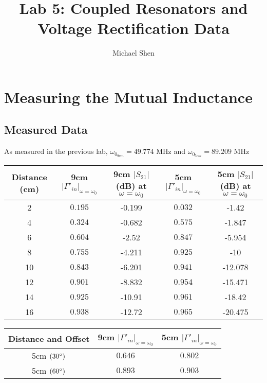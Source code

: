 \documentclass{article}
\begin{document}
\title{Lab 5: Coupled Resonators and Voltage Rectification Data}
\author{Michael Shen}
\date{}
\maketitle

\section{Measuring the Mutual Inductance}

\subsection{Measured Data}
As measured in the previous lab, $\omega_{0_{9cm}} = 49.774$ MHz and $\omega_{0_{5cm}} = 89.209$ MHz

\begin{table}[H]
\centering
\begin{tabular}{|c|c|c|c|c|}
\hline
Distance (cm)& 9cm $\vert\Gamma '_{in}\vert_{\omega=\omega_0}$     
			 & 9cm $\vert S_{21}\vert$ (dB) at $\omega = \omega_0$
			 & 5cm $\vert\Gamma '_{in}\vert_{\omega=\omega_0}$     
			 & 5cm $\vert S_{21}\vert$ (dB) at $\omega = \omega_0$ \\ \hline
2   		 & $0.195$  & -0.199 & $0.032$  & -1.42   \\ \hline
4   	 	 & $0.324$  & -0.682 & $0.575$  & -1.847  \\ \hline
6   	 	 & $0.604$  & -2.52  & $0.847$  & -5.954  \\ \hline
8		     & $0.755$  & -4.211 & $0.925$  & -10     \\ \hline
10  		 & $0.843$  & -6.201 & $0.941$  & -12.078 \\ \hline
12 			 & $0.901$  & -8.832 & $0.954$  & -15.471 \\ \hline
14 			 & $0.925$  & -10.91 & $0.961$  & -18.42  \\ \hline
16  		 & $0.938$  & -12.72 & $0.965$  & -20.475 \\ \hline
\end{tabular}
\end{table}

\begin{table}[h]
\centering
\begin{tabular}{|c|c|c|}
\hline
Distance and Offset	  & 9cm $\vert\Gamma '_{in}\vert_{\omega=\omega_0}$      
			 	  & 5cm $\vert\Gamma '_{in}\vert_{\omega=\omega_0}$ \\ \hline
5cm $(30\degree)$ & $0.646$ & $0.802$   \\ \hline
5cm $(60\degree)$ & $0.893$ & $0.903$ \\ \hline
\end{tabular}
\end{table}
\end{document}
